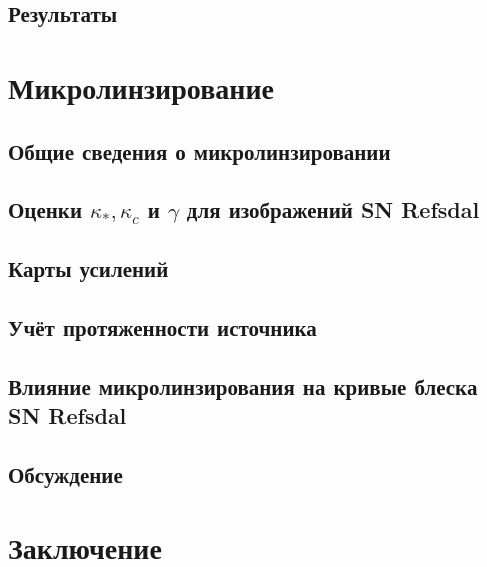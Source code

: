 \documentclass{mipt-thesis-ms}
\numberwithin{equation}{chapter}
\begin{document}
\section{Результаты}


\chapter{Микролинзирование}\label{ch:micro}

\section{Общие сведения о микролинзировании}

\section*{Оценки $\kappa_*, \kappa_c$ и $\gamma$ для изображений SN Refsdal}

\section{Карты усилений}

\section{Учёт протяженности источника}

\section{Влияние микролинзирования на кривые блеска SN Refsdal}

\section{Обсуждение}


\chapter{Заключение}


\backmatter

\printbib

\end{document}
